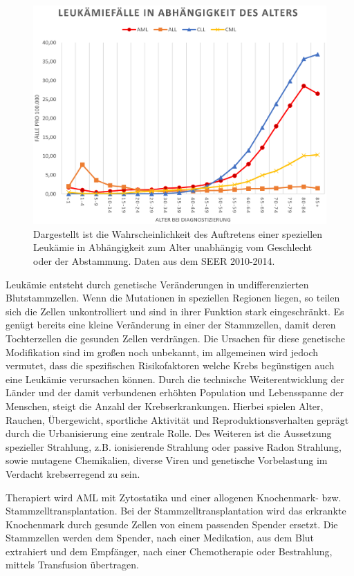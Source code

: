 \begin{figure}
\centering
\includegraphics[width=.95\textwidth]{images/leukaemie_faelle_nach_alter.png}
\caption{Dargestellt ist die Wahrscheinlichkeit des Auftretens einer speziellen Leukämie in Abhängigkeit zum Alter unabhängig vom Geschlecht oder der Abstammung. Daten aus dem SEER 2010-2014.}
\label{fig:Age_AML_ALL}
\end{figure}

Leukämie entsteht durch genetische Veränderungen in undifferenzierten Blutstammzellen. Wenn die Mutationen in speziellen Regionen liegen\cite{Wakita.2016}, so teilen sich die Zellen unkontrolliert und sind in ihrer Funktion stark eingeschränkt. Es genügt bereits eine kleine Veränderung in einer der Stammzellen, damit deren Tochterzellen die gesunden Zellen verdrängen. Die Ursachen für diese genetische Modifikation sind im großen noch unbekannt, im allgemeinen wird jedoch vermutet, dass die spezifischen Risikofaktoren welche Krebs begünstigen auch eine Leukämie verursachen können\cite{Petit.2014}. Durch die technische Weiterentwicklung der Länder und der damit verbundenen erhöhten Population und Lebensspanne der Menschen, steigt die Anzahl der Krebserkrankungen. Hierbei spielen Alter, Rauchen, Übergewicht, sportliche Aktivität und Reproduktionsverhalten geprägt durch die Urbanisierung eine zentrale Rolle\cite{Torre.2015}. Des Weiteren ist die Aussetzung spezieller Strahlung, z.B. ionisierende Strahlung oder passive Radon Strahlung, sowie mutagene Chemikalien, diverse Viren und genetische Vorbelastung im Verdacht krebserregend zu sein.

Therapiert wird \ac{AML} mit Zytostatika und einer allogenen Knochenmark- bzw. Stammzelltransplantation\cite{Cheson.2003}. Bei der Stamm\-zell\-trans\-plan\-tat\-ion wird das erkrankte Knochenmark durch gesunde Zellen von einem passenden Spender ersetzt. Die Stammzellen werden dem Spender, nach einer Medikation, aus dem Blut extrahiert und dem Empfänger, nach einer Chemotherapie oder Bestrahlung, mittels Transfusion übertragen. 

